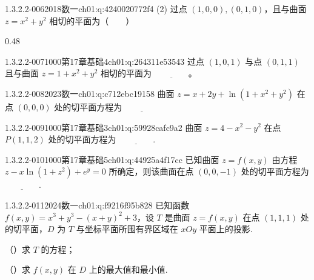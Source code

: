 \begin{q}{1.3.2.2-006}{2018数一}{ch01:q:4240020772f4}
(2) 过点 $(1,0,0),(0,1,0)$，且与曲面 $z=x^2+y^2$ 相切的平面为（　　）
\begin{opts}{0.48}
\hfill{}\\[0.3ex]
\hfill{}
\end{opts}
\end{q}

\begin{q}{1.3.2.2-007}{1000第17章基础4}{ch01:q:264311e53543}
过点 $(1,0,1)$ 与点 $(0,1,1)$ 且与曲面 $z=1+x^2+y^2$ 相切的平面为 $\underline{\hspace{4em}}$。
\end{q}

\begin{q}{1.3.2.2-008}{2023数一}{ch01:q:c712ebc19158}
曲面 $z=x+2y+\ln(1+x^2+y^2)$ 在点 $(0,0,0)$ 处的切平面方程为 $\underline{\hspace{4em}}$
\end{q}

\begin{q}{1.3.2.2-009}{1000第17章基础3}{ch01:q:59928cafc9a2}
曲面 $z=4-x^2-y^2$ 在点 $P(1,1,2)$ 处的切平面方程为 $\underline{\hspace{4em}}$.
\end{q}

\begin{q}{1.3.2.2-010}{1000第17章基础5}{ch01:q:44925a4f17cc}
已知曲面 $z=f(x,y)$ 由方程 $z-x\ln(1+z^2)+e^y=0$ 所确定，则该曲面在点 $(0,0,-1)$ 处的切平面方程为 $\underline{\hspace{4em}}$.
\end{q}

\begin{q}{1.3.2.2-011}{2024数一}{ch01:q:f9216f95b828}
已知函数 $f(x, y) = x^3 + y^3 - (x+y)^2 + 3$，设 $T$ 是曲面 $z = f(x, y)$ 在点 $(1, 1, 1)$ 处的切平面，$D$ 为 $T$ 与坐标平面所围有界区域在 $xOy$ 平面上的投影.

（）求 $T$ 的方程；

（）求 $f(x, y)$ 在 $D$ 上的最大值和最小值.
\end{q}

